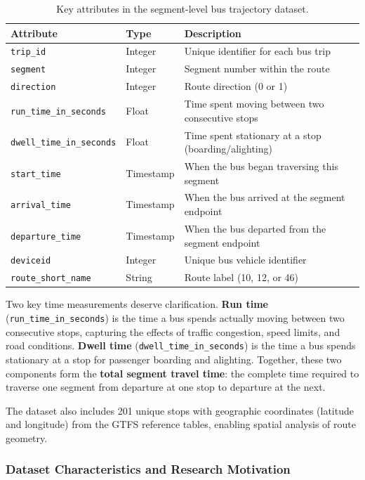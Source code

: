 \begin{table}[htbp]
\centering
\caption{Key attributes in the segment-level bus trajectory dataset.}
\label{tab:dataset_schema}
\begin{tabular}{lll}
\toprule
\textbf{Attribute} & \textbf{Type} & \textbf{Description} \\
\midrule
\texttt{trip\_id} & Integer & Unique identifier for each bus trip \\
\texttt{segment} & Integer & Segment number within the route \\
\texttt{direction} & Integer & Route direction (0 or 1) \\
\texttt{run\_time\_in\_seconds} & Float & Time spent moving between two consecutive stops \\
\texttt{dwell\_time\_in\_seconds} & Float & Time spent stationary at a stop (boarding/alighting) \\
\texttt{start\_time} & Timestamp & When the bus began traversing this segment \\
\texttt{arrival\_time} & Timestamp & When the bus arrived at the segment endpoint \\
\texttt{departure\_time} & Timestamp & When the bus departed from the segment endpoint \\
\texttt{deviceid} & Integer & Unique bus vehicle identifier \\
\texttt{route\_short\_name} & String & Route label (10, 12, or 46) \\
\bottomrule
\end{tabular}
\end{table}

Two key time measurements deserve clarification. \textbf{Run time} (\texttt{run\_time\_in\_seconds}) is the time a bus spends actually moving between two consecutive stops, capturing the effects of traffic congestion, speed limits, and road conditions. \textbf{Dwell time} (\texttt{dwell\_time\_in\_seconds}) is the time a bus spends stationary at a stop for passenger boarding and alighting. Together, these two components form the \textbf{total segment travel time}: the complete time required to traverse one segment from departure at one stop to departure at the next.

The dataset also includes 201 unique stops with geographic coordinates (latitude and longitude) from the GTFS reference tables, enabling spatial analysis of route geometry.

\subsubsection{Dataset Characteristics and Research Motivation}
\label{subsubsec:dataset_characteristics}

